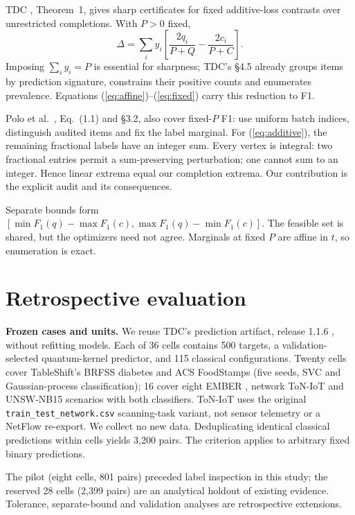 \documentclass[a4paper]{esannV2}
\newcommand{\F}{F_1}
\begin{document}
TDC \cite{tdc}, Theorem~1, gives sharp certificates for fixed additive-loss
contrasts over unrestricted completions. With $P>0$ fixed,
\begin{equation}\label{eq:additive}
 \Delta=\sum_i y_i\left[\frac{2q_i}{P+Q}-\frac{2c_i}{P+C}\right].
\end{equation}
Imposing $\sum_i y_i=P$ is essential for sharpness; TDC's \S4.5 already groups items by
prediction signature, constrains their positive counts and enumerates prevalence.
Equations (\ref{eq:affine})--(\ref{eq:fixed}) carry this reduction to F1.

Polo et al.\ \cite{polo2024}, Eq.~(1.1) and \S3.2, also cover fixed-$P$ F1:
use uniform batch indices, distinguish audited items and fix the label marginal.
For (\ref{eq:additive}), the remaining fractional labels have an integer sum.
Every vertex is integral: two fractional entries permit a sum-preserving
perturbation; one cannot sum to an integer. Hence linear extrema equal our
completion extrema. Our contribution is the explicit audit and its consequences.

Separate bounds form
$[\min\F(q)-\max\F(c),\allowbreak\max\F(q)-\min\F(c)]$. The feasible set is shared, but the optimizers need not agree.
Marginals at fixed $P$ are affine in $t$, so enumeration is exact.

\section{Retrospective evaluation}
\noindent\textbf{Frozen cases and units.} We reuse TDC's prediction artifact,
release 1.1.6 \cite{tdcartifact}, without refitting models. Each of 36 cells
contains 500 targets, a validation-selected quantum-kernel predictor, and
115 classical configurations. Twenty cells cover TableShift's \cite{tableshift} BRFSS diabetes and ACS
FoodStamps (five seeds, SVC and Gaussian-process classification);
16 cover eight EMBER \cite{ember}, network ToN-IoT \cite{toniot}
and UNSW-NB15 \cite{unsw} scenarios with both classifiers.
ToN-IoT uses the original \texttt{train\_test\_network.csv} scanning-task
variant, not sensor telemetry or a NetFlow re-export. We collect no new data.
Deduplicating identical classical predictions within cells yields 3,200 pairs.
The criterion applies to arbitrary fixed binary predictions.

The pilot (eight cells, 801 pairs) preceded label inspection in this study;
the reserved 28 cells (2,399 pairs) are an analytical holdout of existing evidence.
Tolerance, separate-bound and validation analyses are retrospective extensions.
\end{document}
